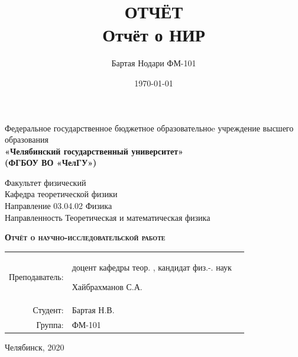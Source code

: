 \documentclass[a4paper]{article}
\author{Бартая Нодари ФМ-101}
\title{ОТЧЁТ\\ Отчёт о НИР}
\date{\today}
\begin{document}
\begin{titlepage}
	\begin{center}
		Федеральное государственное бюджетное образовательноe учреждение высшего образования \\
		\textbf{«Челябинский государственный университет» \\ (ФГБОУ ВО «ЧелГУ»)}
	\end{center}
	\begin{center}
		Факультет физический			\\
		Кафедра теоретической физики	\\
		Направление 03.04.02 Физика		\\
		Направленность Теоретическая и математическая физика
	\end{center}
	\vfill
	\begin{center}
		\textsc{\textbf{Отчёт о научно-исследовательской работе}}
	\end{center}
	\vfill
	\singlespace
	\begin{flushright}
		\begin{tabular}{r p{}l}
			Преподаватель:&	доцент кафедры теор. , кандидат физ.-. наук 
			
			Хайбрахманов С.А. \\[5pt]
			Студент:&	Бартая Н.В.		\\[5pt]
			Группа:& 	ФМ-101			\\
		\end{tabular}
	\end{flushright}
	\onehalfspacing
	\vfill
	\begin{center}
		Челябинск, 2020	
	\end{center}
\end{titlepage}
\end{document}
